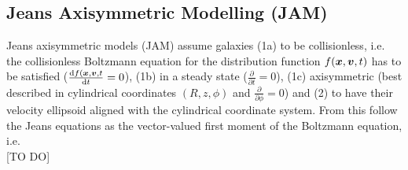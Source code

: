 \subsection{Jeans Axisymmetric Modelling (JAM)}

Jeans axisymmetric models (JAM) assume galaxies (1a) to be collisionless, i.e. the collisionless Boltzmann equation for the distribution function $f(\boldsymbol{x},\boldsymbol{v},t)$ has to be satisfied ($\frac{\mathop{}\!\mathrm{d} f(\boldsymbol{x},\boldsymbol{v},t}{\mathop{}\!\mathrm{d} t} = 0$), (1b) in a steady state ($\frac{\partial}{\partial t} = 0$), (1c) axisymmetric (best described in cylindrical coordinates $(R,z,\phi)$ and $\frac{\partial}{\partial \phi} = 0$) and (2) to have their velocity ellipsoid aligned with the cylindrical coordinate system. From this follow the Jeans equations as the vector-valued first moment of the Boltzmann equation, i.e.
\begin{equation*}
[TO DO]
\end{equation*}
[TO DO]